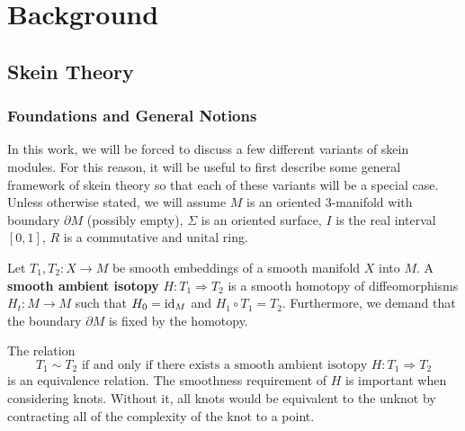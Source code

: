 \chapter{Background}


\section{Skein Theory}

\subsection{Foundations and General Notions}
In this work, we will be forced to discuss a few different variants of skein modules. For this reason, it will be useful to first describe some general framework of skein theory so that each of these variants will be a special case. Unless otherwise stated, we will assume $M$ is an oriented $3$-manifold with boundary $\partial M$ (possibly empty), $\Sigma$ is an oriented surface, $I$ is the real interval $[0,1]$, $R$ is a commutative and unital ring. 

\begin{definition}
    Let $T_1, T_2: X \to M$ be smooth embeddings of a smooth manifold $X$ into $M$. A \textbf{smooth ambient isotopy} $H: T_1 \Rightarrow T_2$ is a smooth homotopy of diffeomorphisms $H_t: M \to M$ such that $H_0={\rm{id}}_M$ and $H_1 \circ T_1 = T_2$. Furthermore, we demand that the boundary $\partial M$ is fixed by the homotopy. 
\end{definition}

The relation 
\[
T_1 \sim T_2 \textrm{ if and only if there exists a smooth ambient isotopy } H: T_1 \Rightarrow T_2
\]
is an equivalence relation. The smoothness requirement of $H$ is important when considering knots. Without it, all knots would be equivalent to the unknot by contracting all of the complexity of the knot to a point. 

